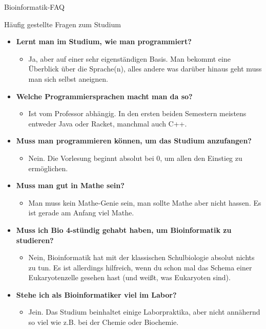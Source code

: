 \begin{Huge}
	Bioinformatik-FAQ
\end{Huge}
\begin{block}{Häufig gestellte Fragen zum Studium}
\begin{large}
	\begin{itemize}
		\item \textbf{Lernt man im Studium, wie man programmiert?}
		\begin{itemize}
			\item Ja, aber auf einer sehr eigenständigen Basis. Man bekommt eine Überblick über die Sprache(n), alles andere was darüber hinaus geht muss man sich selbst aneignen.
		\end{itemize}
	
		\item \textbf{Welche Programmiersprachen macht man da so?}
		\begin{itemize}
			\item Ist vom Professor abhängig. In den ersten beiden Semestern meistens entweder Java oder Racket, manchmal auch C++.
		\end{itemize}
	
		\item \textbf{Muss man programmieren können, um das Studium anzufangen?}
		\begin{itemize}
			\item Nein. Die Vorlesung beginnt absolut bei 0, um allen den Einstieg zu ermöglichen.
		\end{itemize}
	
		\item \textbf{Muss man gut in Mathe sein?}
		\begin{itemize}
			\item Man muss kein Mathe-Genie sein, man sollte Mathe aber nicht hassen. Es ist gerade am Anfang viel Mathe.
		\end{itemize}

				\item \textbf{Muss ich Bio 4-stündig gehabt haben, um Bioinformatik zu studieren?}
				\begin{itemize}
					\item Nein, Bioinformatik hat mit der klassischen Schulbiologie absolut nichts zu tun. Es ist allerdings hilfreich, wenn du schon mal das Schema einer Eukaryotenzelle gesehen hast (und weißt, was Eukaryoten sind).
				\end{itemize}
		
			\item \textbf{Stehe ich als Bioinformatiker viel im Labor?}
			\begin{itemize}
				\item Jein. Das Studium beinhaltet einige Laborpraktika, aber nicht annähernd so viel wie z.B. bei der Chemie oder Biochemie.
			\end{itemize}
	

\end{itemize}
\end{large}
\end{block}
